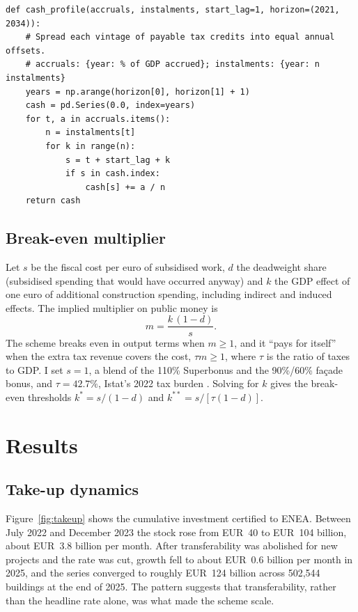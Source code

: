 \documentclass[11pt,a4paper]{article}
\begin{document}
\begin{lstlisting}
def cash_profile(accruals, instalments, start_lag=1, horizon=(2021, 2034)):
    # Spread each vintage of payable tax credits into equal annual offsets.
    # accruals: {year: % of GDP accrued}; instalments: {year: n instalments}
    years = np.arange(horizon[0], horizon[1] + 1)
    cash = pd.Series(0.0, index=years)
    for t, a in accruals.items():
        n = instalments[t]
        for k in range(n):
            s = t + start_lag + k
            if s in cash.index:
                cash[s] += a / n
    return cash
\end{lstlisting}

\subsection{Break-even multiplier}
Let $s$ be the fiscal cost per euro of subsidised work, $d$ the deadweight share (subsidised spending that would have occurred anyway) and $k$ the GDP effect of one euro of additional construction spending, including indirect and induced effects. The implied multiplier on public money is
\begin{equation}
m=\frac{k\,(1-d)}{s}.
\end{equation}
The scheme breaks even in output terms when $m\ge 1$, and it ``pays for itself'' when the extra tax revenue covers the cost, $\tau m\ge1$, where $\tau$ is the ratio of taxes to GDP. I set $s=1$, a blend of the 110\% Superbonus and the 90\%/60\% façade bonus, and $\tau=42.7\%$, Istat's 2022 tax burden \citep{istat2023conti}. Solving for $k$ gives the break-even thresholds $k^{*}=s/(1-d)$ and $k^{**}=s/[\tau(1-d)]$.

\section{Results}
\subsection{Take-up dynamics}
Figure~\ref{fig:takeup} shows the cumulative investment certified to ENEA. Between July 2022 and December 2023 the stock rose from EUR~40 to EUR~104 billion, about EUR~3.8 billion per month. After transferability was abolished for new projects and the rate was cut, growth fell to about EUR~0.6 billion per month in 2025, and the series converged to roughly EUR~124 billion across 502,544 buildings at the end of 2025. The pattern suggests that transferability, rather than the headline rate alone, was what made the scheme scale.
\end{document}
